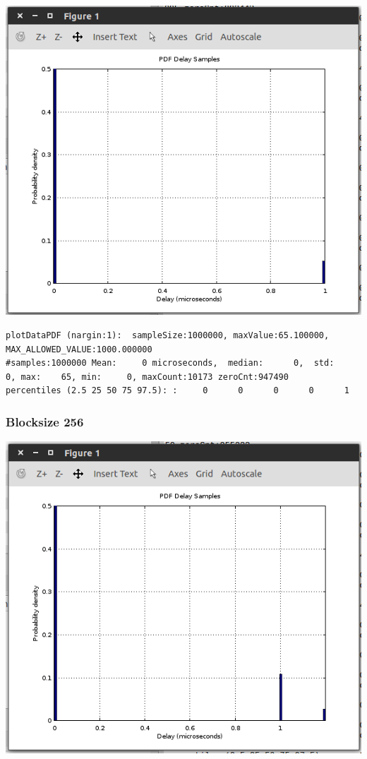 \documentclass{article}
\begin{document}
\includegraphics{q2/hw1-4}

\begin{lstlisting}
plotDataPDF (nargin:1):  sampleSize:1000000, maxValue:65.100000,  MAX_ALLOWED_VALUE:1000.000000
#samples:1000000 Mean:     0 microseconds,  median:      0,  std:      0, max:    65, min:     0, maxCount:10173 zeroCnt:947490
percentiles (2.5 25 50 75 97.5): :     0      0      0      0      1
\end{lstlisting}

\subsubsection{Blocksize 256}

\includegraphics{q2/hw1-256}
\end{document}
